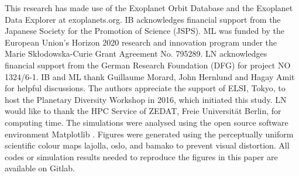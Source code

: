 \documentclass[draft]{agujournal2019} %
\newcommand{\marine}[1]{\textcolor{greenblue}{\textit{(Marine: #1)}}}
\newcommand{\lena}[1]{\textcolor{blue}{\textit{(Lena: #1)}}}
\begin{document}

%

%

%

%

\acknowledgments
This research has made use of the Exoplanet Orbit Database and the Exoplanet Data Explorer at exoplanets.org. IB acknowledges financial support from the Japanese Society for the Promotion of Science (JSPS). ML was funded by the  European Union's Horizon 2020 research and innovation program under the Marie Sk\l{}odowska-Curie Grant Agreement No. 795289. LN acknowledges financial support from the German Research Foundation (DFG) for project NO 1324/6-1. IB and ML thank Guillaume Morard, John Hernlund and Hagay Amit for helpful discussions. The authors appreciate the support of ELSI, Tokyo, to host the Planetary Diversity Workshop in 2016, which initiated this study. LN would like to thank the HPC Service of ZEDAT, Freie Universit\"at Berlin, for computing time. 
The simulations were analysed using the open source software environment Matplotlib \cite{Hunter:2007}. Figures were generated using the perceptually uniform scientific colour maps lajolla, oslo, and bamako \cite{crameri2018scientific} to prevent visual distortion. All codes or simulation results needed to reproduce the figures in this paper are available on Gitlab. %
\end{document}
